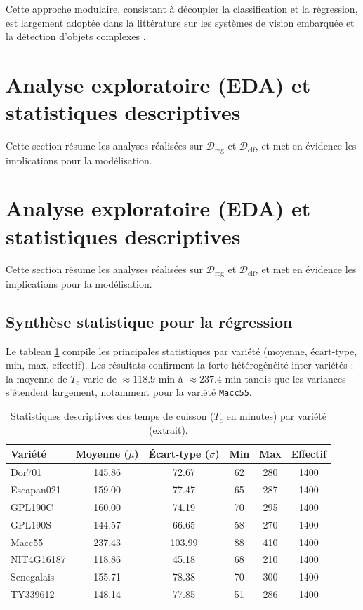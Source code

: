 Cette approche modulaire, consistant à découpler la classification et la régression, est largement adoptée dans la littérature sur les systèmes de vision embarquée et la détection d’objets complexes \cite{redmon2016you,liu2016ssd}.


\section{Analyse exploratoire (EDA) et statistiques descriptives}

Cette section résume les analyses réalisées sur \(\mathcal{D}_{\text{reg}}\) et \(\mathcal{D}_{\text{clf}}\), et met en évidence les implications pour la modélisation.
\section{Analyse exploratoire (EDA) et statistiques descriptives}

Cette section résume les analyses réalisées sur \(\mathcal{D}_{\text{reg}}\) et \(\mathcal{D}_{\text{clf}}\), et met en évidence les implications pour la modélisation.

\subsection{Synthèse statistique pour la régression}

Le tableau \ref{tab:stats_descriptives} compile les principales statistiques par variété (moyenne, écart-type, min, max, effectif). Les résultats confirment la forte hétérogénéité inter-variétés : la moyenne de \(T_c\) varie de \(\approx 118.9\) min à \(\approx 237.4\) min tandis que les variances s'étendent largement, notamment pour la variété \texttt{Macc55}.

\begin{table}[H]
	\centering
	\caption{Statistiques descriptives des temps de cuisson ($T_c$ en minutes) par variété (extrait).}
	\label{tab:stats_descriptives}
	\begin{tabular}{lccccc}
		\toprule
		\textbf{Variété} & \textbf{Moyenne ($\mu$)} & \textbf{Écart-type ($\sigma$)} & \textbf{Min} & \textbf{Max} & \textbf{Effectif} \\ \midrule
		Dor701           & 145.86 & 72.67  & 62  & 280 & 1400 \\
		Escapan021       & 159.00 & 77.47  & 65  & 287 & 1400 \\
		GPL190C          & 160.00 & 74.19  & 70  & 295 & 1400 \\
		GPL190S          & 144.57 & 66.65  & 58  & 270 & 1400 \\
		Macc55           & 237.43 & 103.99 & 88  & 410 & 1400 \\
		NIT4G16187       & 118.86 & 45.18  & 68  & 210 & 1400 \\
		Senegalais       & 155.71 & 78.38  & 70  & 300 & 1400 \\
		TY339612         & 148.14 & 77.85  & 51  & 286 & 1400 \\ 
		\bottomrule
	\end{tabular}
\end{table}

